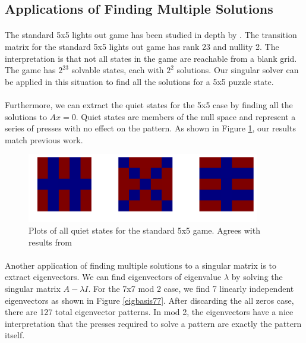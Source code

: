 \documentclass[11pt]{article}
\begin{document}
\subsection*{Applications of Finding Multiple Solutions}

\paragraph{} The standard 5x5 lights out game has been studied in depth by \cite{jaap}.  The transition matrix for the standard 5x5 lights out game has rank 23 and nullity 2.  The interpretation is that not all states in the game are reachable from a blank grid.  The game has $2^23$ solvable states, each with $2^2$ solutions.  Our singular solver can be applied in this situation to find all the solutions for a 5x5 puzzle state.


\paragraph{} Furthermore, we can extract the quiet states for the 5x5 case by finding all the solutions to $Ax = 0$.  Quiet states are members of the null space and represent a series of presses with no effect on the pattern.  As shown in Figure \ref{quiet55}, our results match previous work.

\begin{figure}
\caption{Plots of all quiet states for the standard 5x5 game.  Agrees with results from \cite{jaap}}
\label{quiet55}
\includegraphics[width=4in]{quiet55.png}
\end{figure}

\paragraph{} Another application of finding multiple solutions to a singular matrix is to extract eigenvectors.  We can find eigenvectors of eigenvalue $\lambda$ by solving the singular matrix $A - \lambda I$.  For the 7x7 mod 2 case, we find 7 linearly independent eigenvectors as shown in Figure \ref{eigbasis77}.  After discarding the all zeros case, there are 127 total eigenvector patterns.  In mod 2, the eigenvectors have a nice interpretation that the presses required to solve a pattern are exactly the pattern itself.
\end{document}
